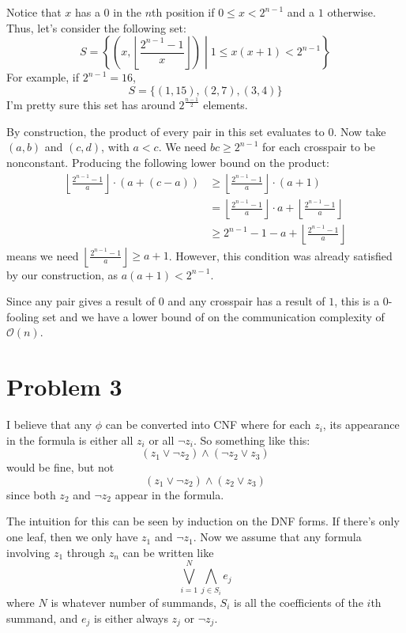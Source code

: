 \documentclass[12pt]{article}
\begin{document}
Notice that $x$ has a $0$ in the $n$th position if $0 \le x < 2^{n-1}$ and a $1$ otherwise.
Thus, let's consider the following set:
\[S=\left\{\left(x, \left\lfloor\frac{2^{n-1}-1}{x}\right\rfloor\right)
\middle| 1 \le x(x+1) < 2^{n-1}\right\}\]
For example, if $2^{n-1}=16$,
\[S=\{(1, 15), (2, 7), (3, 4)\}\]
I'm pretty sure this set has around $2^{\frac{n-1}{2}}$ elements.

By construction, the product of every pair in this set evaluates to $0$.
Now take $(a, b)$ and $(c, d)$, with $a < c$.
We need $bc \ge 2^{n-1}$ for each crosspair to be nonconstant.
Producing the following lower bound on the product:
\begin{align*}
    \left\lfloor\frac{2^{n-1}-1}{a}\right\rfloor \cdot (a+(c-a))
    &\ge \left\lfloor\frac{2^{n-1}-1}{a}\right\rfloor \cdot (a+1) \\
    &= \left\lfloor\frac{2^{n-1}-1}{a}\right\rfloor \cdot a + \left\lfloor\frac{2^{n-1}-1}{a}\right\rfloor \\
    &\ge 2^{n-1}-1-a + \left\lfloor\frac{2^{n-1}-1}{a}\right\rfloor
\end{align*}
means we need $\left\lfloor\frac{2^{n-1}-1}{a}\right\rfloor \ge a+1$.
However, this condition was already satisfied by our construction, as $a(a+1) < 2^{n-1}$.

Since any pair gives a result of $0$ and any crosspair has a result of $1$,
this is a $0$-fooling set and we have a lower bound of on
the communication complexity of $\mathcal{O}(n)$.

\newpage

\section*{Problem 3}

I believe that any $\phi$ can be converted into CNF where for each $z_i$,
its appearance in the formula is either all $z_i$ or all $\lnot z_i$.
So something like this:
\[(z_1 \lor \lnot z_2) \land (\lnot z_2 \lor z_3)\]
would be fine, but not
\[(z_1 \lor \lnot z_2) \land (z_2 \lor z_3)\]
since both $z_2$ and $\lnot z_2$ appear in the formula.

The intuition for this can be seen by induction on the DNF forms.
If there's only one leaf, then we only have $z_1$ and $\lnot z_1$.
Now we assume that any formula involving $z_1$ through $z_n$
can be written like
\[\bigvee_{i=1}^{N} \bigwedge_{j \in S_i} e_j\]
where $N$ is whatever number of summands, $S_i$ is all the coefficients
of the $i$th summand, and $e_j$ is either always $z_j$ or $\lnot z_j$.
\end{document}

